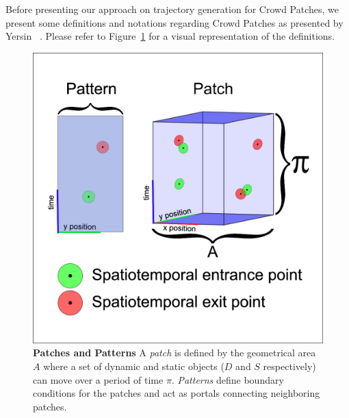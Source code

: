 Before presenting our approach on trajectory generation for Crowd Patches, we present some definitions and notations regarding Crowd Patches as presented by Yersin \etal~\cite{Yersin:2009}.
Please refer to Figure~\ref{fig:definitions} for a visual representation of the definitions.

\begin{figure}
\begin{center}
	\includegraphics[width=\linewidth]{./images/patch-definitions.png}
	\caption{
		\textbf{Patches and Patterns} A \emph{patch} is defined by the geometrical area $A$ where a set of dynamic and static objects ($D$ and $S$ respectively) can move over a period of time $\pi$. \emph{Patterns} define boundary conditions for the patches and act as portals connecting neighboring patches. 
	}
	\label{fig:definitions}
	\end{center}
\end{figure}
 

